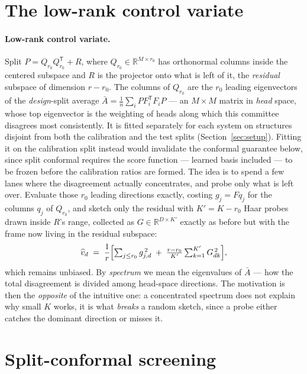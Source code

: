\documentclass{article}
\begin{document}
\section{The low-rank control variate}
\label{app:cv}
\paragraph{Low-rank control variate.}
Split $P = Q_{r_0}Q_{r_0}^{\mathsf T} + R$, where $Q_{r_0}\in\mathbb{R}^{M\times r_0}$ has
orthonormal columns inside the centered subspace and $R$ is the projector onto what is left of it,
the \emph{residual} subspace of dimension $r-r_0$. The columns of $Q_{r_0}$ are the $r_0$ leading
eigenvectors of the \emph{design}-split average $\bar A=\tfrac1n\sum_i PF_i^{\mathsf T}F_iP$ --- an
$M\times M$ matrix in \emph{head} space, whose top eigenvector is the weighting of heads along which
this committee disagrees most consistently. It is fitted separately for
each system on structures disjoint from both the calibration and the test splits
(Section~\ref{sec:setup}). Fitting it on the calibration split instead would invalidate the conformal
guarantee below, since split conformal requires the score function --- learned basis included --- to
be frozen before the calibration ratios are formed. The idea is to spend a few lanes where the disagreement actually concentrates, and probe only what
is left over. Evaluate those $r_0$ leading directions exactly, costing $g_j=Fq_j$ for the columns
$q_j$ of $Q_{r_0}$, and sketch only the residual with $K'=K-r_0$ Haar probes drawn inside $R$'s
range, collected as $G\in\mathbb{R}^{D\times K'}$ exactly as before but with the frame now living in
the residual subspace:
\begin{equation}
\widehat v_d \;=\; \frac{1}{r}\Bigl[\textstyle\sum_{j\le r_0} g_{j,d}^{\,2} \;+\; \frac{r-r_0}{K'}\sum_{k=1}^{K'} G_{dk}^{\,2}\Bigr],
\end{equation}
which remains unbiased. By \emph{spectrum} we mean the eigenvalues of $\bar A$ --- how the total
disagreement is divided among head-space directions. The motivation is then the \emph{opposite} of
the intuitive one: a concentrated spectrum does not explain why small $K$ works, it is what
\emph{breaks} a random sketch, since a probe either catches the dominant direction or misses it.


\section{Split-conformal screening}
\label{app:conformal}
\end{document}
